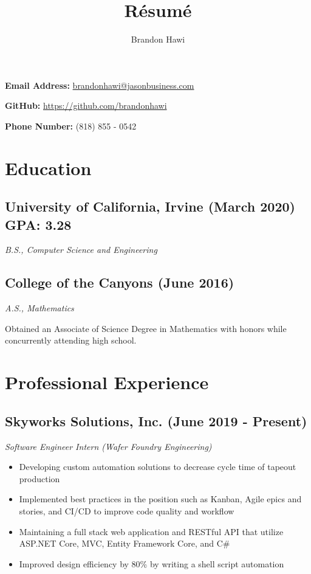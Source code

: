\documentclass[10pt]{article}
\makeatletter
\renewcommand{\maketitle}
{
\huge
\noindent\textbf{\theauthor} \hfill \small{ \textbf{Email Address: }\href{mailto:brandonhawi@jasonbusiness.com}{brandonhawi@jasonbusiness.com}

\hfill \textbf{GitHub: }\href{https://github.com/brandonhawi}{https://github.com/brandonhawi}

\hfill \textbf{Phone Number: }(818) 855 - 0542}}
\makeatother
\begin{document}
\title{R\'esum\'e}
\author{Brandon Hawi}

\maketitle
\vspace{-0.1in}
\section{Education}

\subsection{University of California, Irvine (March 2020) \hfill GPA: 3.28}
\noindent\textit{B.S., Computer Science and Engineering}

\subsection{College of the Canyons (June 2016)}
\noindent\textit{A.S., Mathematics}

Obtained an Associate of Science Degree in Mathematics with honors while concurrently attending
high school.

\vfill

\section{Professional Experience}

\subsection{Skyworks Solutions, Inc. (June 2019 - Present)}

\noindent\textit{Software Engineer Intern (Wafer Foundry Engineering)}

\begin{itemize}
	\setlength\itemsep{0em}
	\item Developing custom automation solutions to decrease cycle time of tapeout production
	\item Implemented best practices in the position such as Kanban, Agile epics and stories, and CI/CD to improve code quality and workflow
	\item Maintaining a full stack web application and RESTful API that utilize ASP.NET Core, MVC, Entity Framework Core, and C\#
	\item Improved design efficiency by 80\% by writing a shell script automation
\end{itemize}
\end{document}
